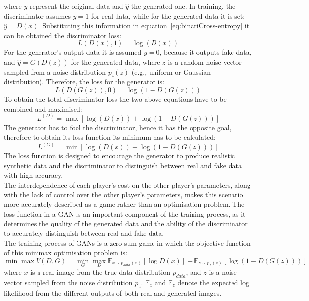 where $y$ represent the original data and $\hat{y}$ the generated one. In training, the discriminator assumes $y=1$ for real data, while for the generated data it is set: $\hat{y} = D(x)$. Substituting this information in equation~\ref{eq:binariCross-entropy} it can be obtained the discriminator loss: 
\begin{equation}
    L(D(x),1)=\log(D(x))
\end{equation}
For the generator's output data it is assumed $y = 0$, because it outputs fake data, and $\hat{y} = G(D(z))$ for the generated data, where $z$ is a random noise vector sampled from a noise distribution $p_z(z)$ (e.g., uniform or Gaussian distribution). Therefore, the loss for the generator is:
\begin{equation}
    L(D(G(z)),0) = \log(1 - D(G(z)))
\end{equation}
To obtain the total discriminator loss the two above equations have to be combined and maximised:
\begin{equation}
L^{(D)}=\max [\log (D(x)) + \log(1-D(G(z)))]
\end{equation}
The generator has to fool the discriminator, hence it has the opposite goal, therefore to obtain its loss function its minimum has to be calculated:
\begin{equation}
L^{(G)}=\min [\log (D(x)) + \log(1-D(G(z)))]
\end{equation}
The loss function is designed to encourage the generator to produce realistic synthetic data and the discriminator to distinguish between real and fake data with high accuracy.
\\
The interdependence of each player's cost on the other player's parameters, along with the lack of control over the other player's parameters, makes this scenario more accurately described as a game rather than an optimisation problem. 
The loss function in a GAN is an important component of the training process, as it determines the quality of the generated data and the ability of the discriminator to accurately distinguish between real and fake data. 
\\
\noindent The training process of GANs is a zero-sum game in which the objective function of this minimax optimisation problem is:
\begin{equation}
\label{eq:minimax obj function}
    \min \max V(D,G) = \min_G \max_D \mathbb{E}_{x \sim p_{data}(x)}[\log D(x)]+\mathbb{E}_{z \sim p_z(z)}[\log (1- D(G(z)))]
\end{equation}
where $x$ is a real image from the true data distribution $p_{data}$, and $z$ is a noise vector sampled from the noise distribution $p_z$. $\mathbb{E}_x$ and $\mathbb{E}_z$ denote the expected log likelihood from the different outputs of both real and generated images.

